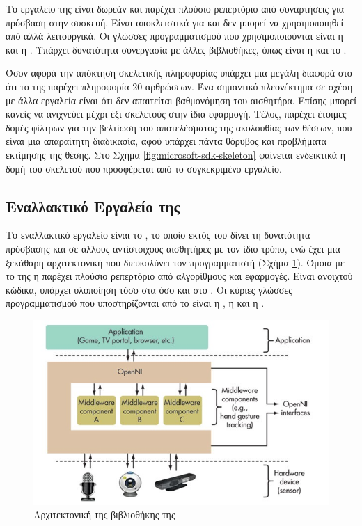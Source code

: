 Το εργαλείο της  είναι δωρεάν και παρέχει πλούσιο ρεπερτόριο από συναρτήσεις για πρόσβαση στην συσκευή. Είναι αποκλειστικά για  και δεν μπορεί να χρησιμοποιηθεί από αλλά λειτουργικά. Οι γλώσσες προγραμματισμού που χρησιμοποιούνται είναι η  και η . Υπάρχει δυνατότητα συνεργασία με άλλες βιβλιοθήκες, όπως είναι η  και το .

Όσον αφορά την απόκτηση σκελετικής πληροφορίας υπάρχει μια μεγάλη διαφορά στο ότι το  της  παρέχει πληροφορία 20 αρθρώσεων. Ένα σημαντικό πλεονέκτημα σε σχέση με άλλα εργαλεία είναι ότι δεν απαιτείται βαθμονόμηση του αισθητήρα. Επίσης μπορεί κανείς να ανιχνεύει μέχρι έξι σκελετούς στην ίδια εφαρμογή. Τέλος, παρέχει έτοιμες δομές φίλτρων για την βελτίωση του αποτελέσματος της ακολουθίας των θέσεων, που είναι μια απαραίτητη διαδικασία, αφού υπάρχει πάντα θόρυβος και προβλήματα εκτίμησης της θέσης. Στο Σχήμα \ref{fig:microsoft-sdk-skeleton} φαίνεται ενδεικτικά η δομή του σκελετού που προσφέρεται από το συγκεκριμένο εργαλείο.

\subsection{\texorpdfstring{Εναλλακτικό Εργαλείο της }{}}

Το εναλλακτικό εργαλείο είναι το , το οποίο εκτός του  δίνει τη δυνατότητα πρόσβασης και σε άλλους αντίστοιχους αισθητήρες με τον ίδιο τρόπο, ενώ έχει μια ξεκάθαρη αρχιτεκτονική που διευκολύνει τον προγραμματιστή (Σχήμα \ref{fig:openni-framework}). Όμοια με το  της  η  παρέχει πλούσιο ρεπερτόριο από αλγορίθμους και εφαρμογές. Είναι ανοιχτού κώδικα, υπάρχει υλοποίηση τόσο στα  όσο και στο  . Οι κύριες γλώσσες προγραμματισμού  που υποστηρίζονται από το  είναι η , η  και η .

\begin{figure}[H]
    \centering
    \includegraphics[width=.8\textwidth, height=.3\textheight, keepaspectratio]{fig/openni-framework.jpg}
    \caption{Αρχιτεκτονική της βιβλιοθήκης της \protect\footnotemark}
    \label{fig:openni-framework}
\end{figure}

